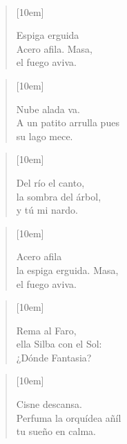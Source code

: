 \\[0.1cm]

\begin{verse}[10em]
\begin{altverse}
Espiga erguida\\
Acero afila. Masa,\\
el fuego aviva.\\
\end{altverse}
\end{verse}

\begin{verse}[10em]
\begin{altverse}
Nube alada va.\\
A un patito arrulla pues\\
su lago mece.\\
\end{altverse}
\end{verse}

\begin{verse}[10em]
\begin{altverse}
Del río el canto,\\
la sombra del árbol,\\
y tú mi nardo.\\
\end{altverse}
\end{verse}

\begin{verse}[10em]
\begin{altverse}

Acero afila\\
la espiga erguida. Masa,\\
el fuego aviva.\\
\end{altverse}
\end{verse}

\begin{verse}[10em]
\begin{altverse}
Rema al Faro,\\
ella Silba con el Sol:\\
¿Dónde Fantasia?\\
\end{altverse}
\end{verse}

\begin{verse}[10em]
\begin{altverse}
Cisne descansa.\\
Perfuma la orquídea añíl\\
tu sueño en calma.\\
\end{altverse}
\end{verse}